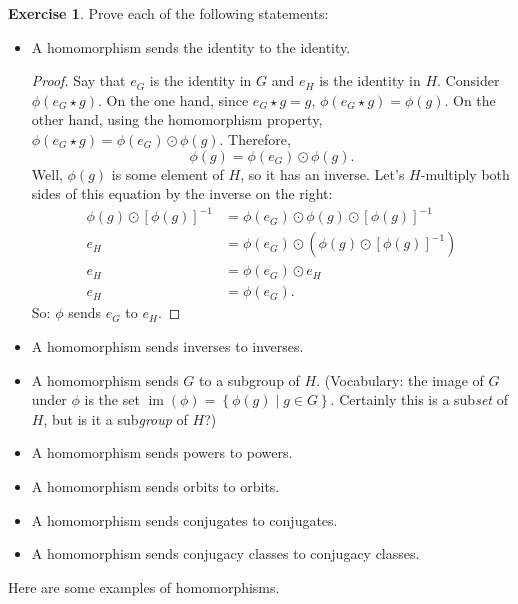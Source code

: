\documentclass[12pt]{article}
\theoremstyle{definition} %
\newtheorem*{exercise}{Exercise}
\newcommand{\Alert}[1]{\textcolor{xRed}{#1}}
\newcommand\inv{^{-1}} %
\DeclareMathOperator{\im}{im}
\begin{document}
\begin{exercise} Prove each of the following statements:
    \newcommand\hitem{\item A homomorphism sends }
    \begin{itemize}
        \hitem the identity to the identity. 
        \begin{proof} 
            Say that $e_G$ is the identity in $G$ and $e_H$ is the identity in $H$. Consider $\phi(e_G \star g)$. On the one hand, since $e_G\star g = g$, $\phi(e_G \star g) = \phi(g)$. On the other hand, using the homomorphism property, $\phi(e_G \star g) = \phi(e_G) \odot \phi(g)$. Therefore, \[\phi(g) = \phi(e_G)\odot \phi(g).\]
            Well, $\phi(g)$ is some element of $H$, so it has an inverse. Let's $H$-multiply both sides of this equation by the inverse on the right:
            \begin{align*}
                \phi(g)\odot [\phi(g)]\inv &= \phi(e_G) \odot \phi(g) \odot [\phi(g)]\inv \\
                e_H &= \phi(e_G) \odot \left(\phi(g) \odot [\phi(g)]\inv\right) \\
                e_H &= \phi(e_G) \odot e_H \\
                e_H &= \phi(e_G).
            \end{align*}So: $\phi$ sends $e_G$ to $e_H$.
        \end{proof}
        \hitem inverses to inverses.
        \hitem $G$ to a subgroup of $H$. (Vocabulary: the \Alert{image} of $G$ under $\phi$ is the set $\im(\phi) = \left\{\phi(g)\mid g\in G\right\}.$ Certainly this is a sub\textit{set} of $H$, but is it a sub\textit{group} of $H$?)
        \hitem powers to powers.
        \hitem orbits to orbits.
        \hitem conjugates to conjugates.
        \hitem conjugacy classes to conjugacy classes.
    \end{itemize}
\end{exercise}

Here are some examples of homomorphisms.
\end{document}
